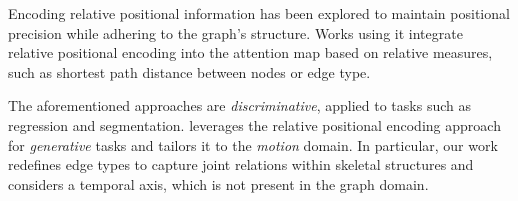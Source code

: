 Encoding relative positional information has been explored to maintain positional precision while adhering to the graph's structure. Works using it \cite{ying2021transformers, shaw2018self, park2022grpe} integrate relative positional encoding into the attention map based on relative measures, such as shortest path distance between nodes or edge type.

The aforementioned approaches are \emph{discriminative}, applied to tasks such as regression and segmentation.
\algoname leverages the relative positional encoding approach for \emph{generative} tasks and tailors it to the \emph{motion}
domain. In particular, our work redefines edge types to capture joint relations within skeletal structures and considers a temporal axis, which is not present in the graph domain.



